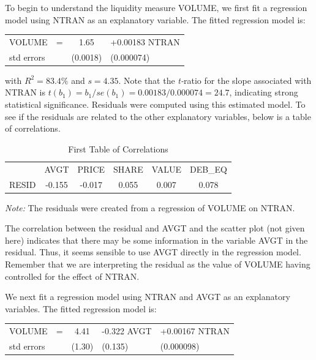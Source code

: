 To begin to understand the liquidity measure VOLUME, we first fit a
regression model using NTRAN as an explanatory variable. The fitted
regression model is:

\begin{center}
\begin{tabular}{lccl}
  VOLUME & = & 1.65 & +0.00183 NTRAN \\
  std errors &  & (0.0018)  & (0.000074) \\
\end{tabular}
\end{center}

\noindent with $R^2=83.4\%$ and $s=4.35$. Note that the
\textit{t-}ratio for the slope associated with NTRAN is
$t(b_1)=b_1/se(b_1)=0.00183/0.000074=24.7$, indicating strong
statistical significance. Residuals were computed using this
estimated model. To see if the residuals are related to the other
explanatory variables, below is a table of correlations.


\begin{table}[h]

\caption{\label{T5:LiquidResidCorr1} First Table of Correlations }
\begin{tabular}{cccccc}
 \hline
& AVGT & PRICE & SHARE & VALUE & DEB\_EQ \\
RESID & -0.155 & -0.017 & 0.055 & 0.007 & 0.078 \\ \hline
\end{tabular}

{\small \textit{Note:} The residuals were created from a regression
of VOLUME on NTRAN.} 
\end{table}

The correlation between the residual and AVGT and the scatter plot (not
given here) indicates that there may be some information in the variable
AVGT in the residual. Thus, it seems sensible to use AVGT directly in the
regression model. Remember that we are interpreting the residual as the
value of VOLUME having controlled for the effect of NTRAN.

We next fit a regression model using NTRAN and AVGT as an explanatory
variables. The fitted regression model is:

\begin{center}
\begin{tabular}{lccll}
  VOLUME     & = & 4.41   & -0.322 AVGT & +0.00167 NTRAN \\
  std errors &   & (1.30) & (0.135)     & (0.000098)     \\
\end{tabular}
\end{center}


